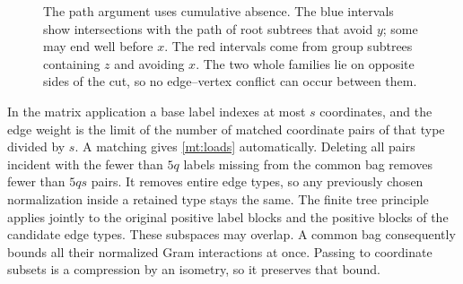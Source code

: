 \begin{figure}[htbp]
\centering
{}
\caption{The path argument uses cumulative absence.  The blue intervals
show intersections with the path of root subtrees that avoid \(y\);
some may end well before \(x\).  The red intervals come from group
subtrees containing \(z\) and avoiding \(x\).  The two whole families
lie on opposite sides of the cut, so no edge--vertex conflict can
occur between them.}
\label{mt:fig-path}
\end{figure}

\begin{remark}\label{mt:coordinate-interface}
In the matrix application a base label indexes at most \(s\)
coordinates, and the edge weight is the limit of the number of matched
coordinate pairs of that type divided by \(s\).  A matching gives
\eqref{mt:loads} automatically.  Deleting all pairs incident with the
fewer than \(5q\) labels missing from the common bag removes fewer
than \(5qs\) pairs.  It removes entire edge types, so any previously
chosen normalization inside a retained type stays the same.
The finite tree principle applies jointly to the original positive
label blocks and the positive blocks of the candidate edge types.
These subspaces may overlap.  A common bag consequently bounds all
their normalized Gram interactions at once.  Passing to coordinate
subsets is a compression by an isometry, so it preserves that bound.
\end{remark}
